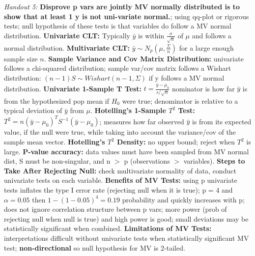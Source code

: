 \documentclass[9pt]{extarticle}
\begin{document}
\textit{Handout 5:}
\textbf{Disprove p vars are jointly MV normally distributed is to show that 
at least 1 y is not uni-variate normal.}; using qq-plot or rigorous tests; null
hypothesis of these tests is that variables do follow a MV normal distribution.
\textbf{Univariate CLT:} Typically $\bar{y}$ is within $\frac{\sigma}{\sqrt{n}}$ 
of $\mu$ and follows a normal distribution.
\textbf{Multivariate CLT:} $\bar{y} \sim N_p(\mu, \frac{\Sigma}{n})$ for a large 
enough sample size $n$.
\textbf{Sample Variance and Cov Matrix Distribution:} univariate follows a 
chi-squared distribution; sample var/cov matrix follows a Wishart distribution:
$(n-1)S \sim Wishart(n-1, \Sigma)$ if y follows a MV normal distribution.
\textbf{Univariate 1-Sample T Test:} $t = \frac{\bar{y} - \mu_0}{s/\sqrt{n}}$ 
nominator is how far $\bar{y}$ is from the hypothesized pop mean if $H_0$ were 
true; denominator is relative to a typical deviation of $\bar{y}$ from $\mu$.
\textbf{Hotelling's 1-Sample $T^2$ Test:} $T^2 = n(\bar{y} - \mu_0)^TS^{-1}
(\bar{y} - \mu_0)$; measures how far observed $\bar{y}$ is from its expected
value, if the null were true, while taking into account the variance/cov of the 
sample mean vector.
\textbf{Hotelling's $T^2$ Density:} no upper bound; reject when $T^2$ is large.
\textbf{P-value accuracy:} data values must have been sampled from MV normal 
dist, S must be non-singular, and n $>$ p (observations $>$ variables).
\textbf{Steps to Take After Rejecting Null:} check multivariate normality of 
data, conduct univariate tests on each variable.
\textbf{Benefits of MV Tests:} using p univariate tests inflates the type I
error rate (rejecting null when it is true); p = 4 and $\alpha = 0.05$ then
$1 - (1 - 0.05)^4 = 0.19$ probability and quickly increases with p; does not
ignore correlation structure between p vars; more power (prob of rejecting 
null when null is true) and high power is good; small deviations may be
statistically significant when combined.
\textbf{Limitations of MV Tests:} interpretations difficult without univariate
tests when statistically significant MV test; \textbf{non-directional} so
null hypothesis for MV is 2-tailed.
\end{document}
